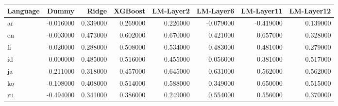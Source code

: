 \begin{tabular}{lrrrrrrr}
\toprule
Language & Dummy & Ridge & XGBoost & LM-Layer2 & LM-Layer6 & LM-Layer11 & LM-Layer12 \\
\midrule
ar & -0.016000 & 0.339000 & 0.269000 & 0.226000 & -0.079000 & -0.419000 & 0.139000 \\
en & -0.003000 & 0.473000 & 0.602000 & 0.670000 & 0.421000 & 0.657000 & 0.328000 \\
fi & -0.020000 & 0.288000 & 0.508000 & 0.534000 & 0.483000 & 0.481000 & 0.279000 \\
id & -0.000000 & 0.485000 & 0.516000 & 0.455000 & -0.056000 & 0.381000 & -0.517000 \\
ja & -0.211000 & 0.318000 & 0.457000 & 0.645000 & 0.631000 & 0.562000 & 0.562000 \\
ko & -0.108000 & 0.408000 & 0.514000 & 0.588000 & 0.349000 & 0.650000 & 0.515000 \\
ru & -0.494000 & 0.341000 & 0.386000 & 0.249000 & 0.554000 & 0.556000 & 0.370000 \\
\bottomrule
\end{tabular}
